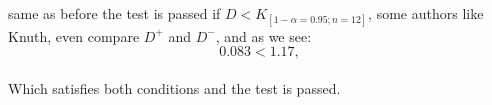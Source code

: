 \documentclass{article}
\begin{document}
\paragraph{}same as before the test is passed if $D < K_{[1-\alpha=0.95;n=12]}$, some authors like Knuth, even compare $D^+$ and $D^-$, and as we see:
$$0.083 < 1.17,$$
\paragraph{} Which satisfies both conditions and the test is passed.
\end{document}
